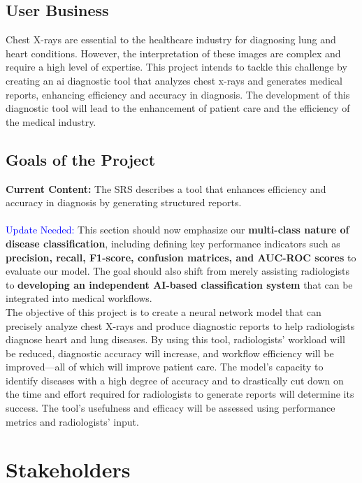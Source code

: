 \documentclass[12pt]{article}
\begin{document}
\subsection{User Business}
Chest X-rays are essential to the healthcare industry for diagnosing lung and heart conditions. 
However, the interpretation of these images are complex and require a high level of expertise. 
This project intends to tackle this challenge by creating an ai diagnostic tool that analyzes 
chest x-rays and generates medical reports, enhancing efficiency and accuracy in diagnosis. The 
development of this diagnostic tool will lead to the enhancement of patient care and the 
efficiency of the medical industry. 

\subsection{Goals of the Project}
\textbf{Current Content:} The SRS describes a tool that enhances efficiency and accuracy in diagnosis by generating structured reports. \\
\\
{\textcolor{blue}{Update Needed:}} This section should now emphasize our \textbf{multi-class nature of disease classification}, including defining key performance indicators such as \textbf{precision, recall, F1-score, confusion matrices, and AUC-ROC scores} to evaluate our model. The goal should also shift from merely assisting radiologists to \textbf{developing an independent AI-based classification system} that can be integrated into medical workflows.\\

The objective of this project is to create a neural network model that can precisely analyze chest 
X-rays and produce diagnostic reports to help radiologists diagnose heart and lung diseases. By 
using this tool, radiologists' workload will be reduced, diagnostic accuracy will increase, and 
workflow efficiency will be improved—all of which will improve patient care. The model's capacity 
to identify diseases with a high degree of accuracy and to drastically cut down on the time and 
effort required for radiologists to generate reports will determine its success. The tool's 
usefulness and efficacy will be assessed using performance metrics and radiologists' input.

\section{Stakeholders}
\end{document}
